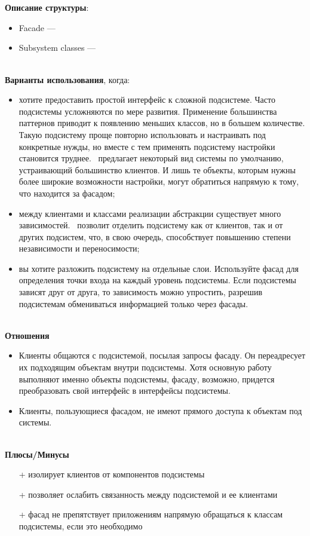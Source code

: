 \documentclass[a3paper,11pt]{report}
\begin{document}
\\\\
\textbf{Описание структуры}:
\begin{itemize}
\item Facade ---
\item Subsystem classes --- 
\end{itemize}

\large\textbf{\\Варианты использования}, когда:
\begin{itemize}
\item хотите предоставить простой интерфейс к сложной подсистеме. Часто подсистемы усложняются по мере развития. Применение большинства паттернов приводит к появлению меньших классов, но в большем количестве. Такую подсистему проще повторно использовать и настраивать под конкретные нужды, но вместе с тем применять подсистему настройки становится труднее. \ предлагает некоторый вид системы по умолчанию, устраивающий большинство клиентов. И лишь те объекты, которым нужны более широкие возможности настройки, могут обратиться напрямую к тому, что находится за фасадом;
\item между клиентами и классами реализации абстракции существует много зависимостей. \ позволит отделить подсистему как от клиентов, так и от других подсистем, что, в свою очередь, способствует повышению степени независимости и переносимости;
\item вы хотите разложить подсистему на отдельные слои. Используйте фасад для определения точки входа на каждый уровень подсистемы. Если подсистемы зависят друг от друга, то зависимость можно упростить, разрешив подсистемам обмениваться информацией только через фасады.
\end{itemize}

\textbf{\\Отношения}
\begin{itemize}
\item Клиенты общаются с подсистемой, посылая запросы фасаду. Он переадресует их подходящим объектам внутри подсистемы. Хотя основную работу выполняют именно объекты подсистемы, фасаду, возможно, придется преобразовать свой интерфейс в интерфейсы подсистемы.
\item Клиенты, пользующиеся фасадом, не имеют прямого доступа к объектам под
системы.
\end{itemize}

\textbf{\\Плюсы/Минусы}
\begin{itemize}
\item[+] изолирует клиентов от компонентов подсистемы
\item[+] позволяет ослабить связанность между подсистемой и ее клиентами
\item[+] фасад не препятствует приложениям напрямую обращаться к классам подсистемы, если это необходимо
\end{itemize}
\end{document}
